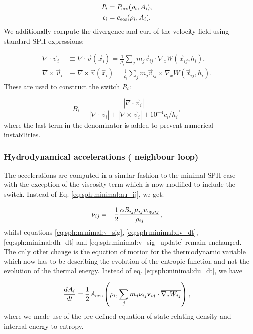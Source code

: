\begin{align}
  P_i &= P_{\rm eos}(\rho_i, A_i),   \label{eq:sph:gadget2:P}\\
  c_i &= c_{\rm eos}(\rho_i, A_i).   \label{eq:sph:gadget2:c}
\end{align}
We additionally compute the divergence and
curl of the velocity field using standard SPH expressions:

\begin{align}
  \nabla\cdot\vec{v}_i &\equiv\nabla\cdot \vec{v}(\vec{x}_i) = \frac{1}{\rho_i} \sum_j m_j
  \vec{v}_{ij}\cdot\nabla_x W(\vec{x}_{ij}, h_i) \label{eq:sph:gadget2:div_v},\\ 
    \nabla\times\vec{v}_i &\equiv \nabla\times \vec{v}(\vec{x}_i) = \frac{1}{\rho_i} \sum_j m_j
  \vec{v}_{ij}\times\nabla_x W(\vec{x}_{ij}, h_i) \label{eq:sph:gadget2:rot_v}.
\end{align}
These are used to construct the \cite{Balsara1995} switch $B_i$:

\begin{equation}
  B_i = \frac{|\nabla\cdot\vec{v}_i|}{|\nabla\cdot\vec{v}_i| +
    |\nabla\times\vec{v}_i| + 10^{-4}c_i / h_i}, \label{eq:sph:gadget2:balsara}
\end{equation}
where the last term in the denominator is added to prevent numerical instabilities.

\subsubsection{Hydrodynamical accelerations ( neighbour loop)}

The accelerations are computed in a similar fashion to the minimal-SPH
case with the exception of the viscosity term which is now modified to
include the switch. Instead of Eq. \ref{eq:sph:minimal:nu_ij}, we get:

\begin{equation}
\nu_{ij} = -\frac{1}{2}\frac{\alpha \bar B_{ij} \mu_{ij} v_{{\rm sig},ij}}{\bar\rho_{ij}},
  \label{eq:sph:gadget2:nu_ij}  
\end{equation}
whilst equations \ref{eq:sph:minimal:v_sig},
\ref{eq:sph:minimal:dv_dt}, \ref{eq:sph:minimal:dh_dt} and
\ref{eq:sph:minimal:v_sig_update} remain unchanged. The only other
change is the equation of motion for the thermodynamic variable which
now has to be describing the evolution of the entropic function and
not the evolution of the thermal energy. Instead of
eq. \ref{eq:sph:minimal:du_dt}, we have

\begin{equation}
\frac{dA_i}{dt} = \frac{1}{2} A_{\rm eos}\left(\rho_i, \sum_j
m_j \nu_{ij}{\mathbf{v}}_{ij}\cdot \overline{\nabla_xW_{ij}}\right),
\end{equation}
where we made use of the pre-defined equation of state relating
density and internal energy to entropy.

